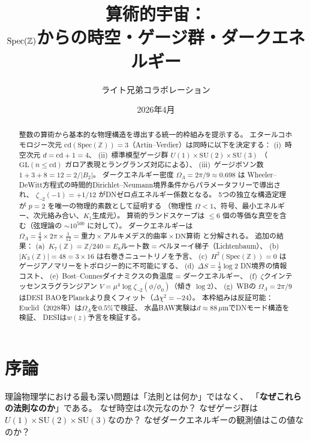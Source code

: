 \documentclass[12pt,a4paper]{article}
\title{\textbf{算術的宇宙：\\
$\Spec(\Z)$からの時空・ゲージ群・ダークエネルギー}}
\author{ライト兄弟コラボレーション}
\date{2026年4月}
\theoremstyle{definition}
\newcommand{\Spec}{\mathrm{Spec}}
\newcommand{\cd}{\mathrm{cd}}
\newcommand{\GL}{\mathrm{GL}}
\newcommand{\SU}{\mathrm{SU}}
\newcommand{\Z}{\mathbb{Z}}
\newcommand{\OmL}{\Omega_\Lambda}
\newcommand{\zetanot}{\zeta_{\neg 2}}
\begin{document}
\maketitle

\begin{abstract}
整数の算術から基本的な物理構造を導出する統一的枠組みを提示する。
エタールコホモロジー次元 $\cd(\Spec(\Z))=3$（Artin--Verdier）は同時に以下を決定する：
(i)~時空次元 $d=\cd+1=4$、
(ii)~標準模型ゲージ群 $U(1)\times\SU(2)\times\SU(3)$
（$\GL(n\le\cd)$ ガロア表現とラングランズ対応による）、
(iii)~ゲージボソン数 $1+3+8=12=2/|B_2|$。
ダークエネルギー密度 $\OmL=2\pi/9\approx0.698$ は
Wheeler--DeWitt方程式の時間的Dirichlet--Neumann境界条件からパラメータフリーで導出され、
$\zetanot(-1)=+1/12$ がDNゼロ点エネルギー係数となる。
5つの独立な構造定理が $p=2$ を唯一の物理的素数として証明する
（物理性 $\Omega<1$、符号、最小エネルギー、次元絡み合い、$K_1$生成元）。
算術的ランドスケープは $\le 6$ 個の等価な真空を含む（弦理論の $\sim\!10^{500}$ に対して）。
ダークエネルギーは
$\OmL=\tfrac{4}{3}\times 2\pi\times\tfrac{1}{12}
=\text{重力}\times\text{アルキメデス的曲率}\times\text{DN算術}$
と分解される。
追加の結果：
(a)~$K_7(\Z)=\Z/240=E_8$ルート数$=$ベルヌーイ梯子（Lichtenbaum）、
(b)~$|K_3(\Z)|=48=3\times 16$ は右巻きニュートリノを予言、
(c)~$H^2(\Spec(\Z))=0$ はゲージアノマリーをトポロジー的に不可能にする、
(d)~$\Delta S=\tfrac{1}{2}\log 2$ DN境界の情報コスト、
(e)~Bost--Connesダイナミクスの負温度$=$ダークエネルギー、
(f)~$\zeta$クインテッセンスラグランジアン $V=\mu^4\log\zetanot(\phi/\phi_0)$（傾き $\log 2$）、
(g)~WBの $\OmL=2\pi/9$ はDESI BAOをPlanckより良くフィット（$\Delta\chi^2=-24$）。
本枠組みは反証可能：
Euclid（2028年）は$\OmL$を$0.5\%$で検証、
水晶BAW実験は$d\approx 88\,\mu$mでDNモード構造を検証、
DESIは$w(z)$予言を検証する。
\end{abstract}

\tableofcontents
\newpage

\section{序論}\label{sec:intro}

理論物理学における最も深い問題は「法則とは何か」ではなく、
「\textbf{なぜこれらの法則なのか}」である。
なぜ時空は4次元なのか？ なぜゲージ群は$U(1)\times\SU(2)\times\SU(3)$なのか？
なぜダークエネルギーの観測値はこの値なのか？
\end{document}

